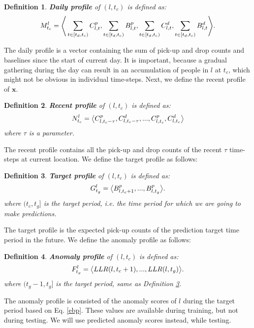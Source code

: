\documentclass[letterpaper]{article} %
\newtheorem{definition}{Definition}
\begin{document}
\begin{definition}
	\textbf{Daily profile} of $(l,t_c)$ is defined as:
	\begin{equation}
	\small
	M^l_{t_c}=\Bigg\langle\sum_{t\in {[t_d,t_c)}}C^p_{l,t},\sum_{t\in {[t_d,t_c)}}B^p_{l,t},\sum_{t\in {[t_d,t_c)}}C^d_{l,t},\sum_{t\in {[t_d,t_c)}}B^d_{l,t}\Bigg\rangle.
	\end{equation}
\end{definition}
The daily profile is a vector containing the sum of pick-up and drop counts and baselines since the start of current day. It is important, because a gradual gathering during the day can result in an accumulation of people in $l$ at $t_c$, which might not be obvious in individual time-steps. Next, we define the recent profile of $\textbf{x}$.
\begin{definition}
	\textbf{Recent profile} of $(l,t_c)$ is defined as:
	\begin{equation}
	\small
	N^l_{t_c}=\big\langle C^p_{l,t_c-\tau},C^d_{l,t_c-\tau},..., C^p_{l,t_c},C^d_{l,t_c}\big\rangle
	\end{equation}
	where $\tau$ is a parameter.
\end{definition}
The recent profile contains all the pick-up and drop counts of the recent $\tau$ time-steps at current location. 
We define the target profile as follows:
\begin{definition}
	\textbf{Target profile} of $(l,t_c)$ is defined as:
	\begin{equation}
	\small
	G^l_{t_g}=\big\langle B^p_{l,t_c+1},...,B^p_{l,t_g}\big\rangle.
	\end{equation}
	where ${(t_c,t_g]}$ is the target period, i.e. the time period for which we are going to make predictions.
	\label{target}
\end{definition}
The target profile is the expected pick-up counts of the prediction target time period in the future. We define the anomaly profile as follows:
\begin{definition}
	\textbf{Anomaly profile} of $(l,t_c)$ is defined as:
	\begin{equation}
	\small
	F^l_{t_g}=\big\langle LLR(l,t_c+1),...,LLR(l,t_g)\big\rangle.
	\end{equation}
	where ${(t_g-1,t_g]}$ is the target period, same as Definition \ref{target}.
\end{definition}
The anomaly profile is consisted of the anomaly scores of $l$ during the target period based on Eq. \ref{ebp}. These values are available during training, but not during testing. We will use predicted anomaly scores instead, while testing.
\end{document}
